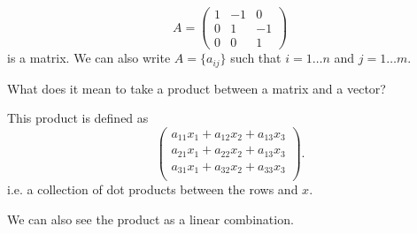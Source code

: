 
\begin{eg}
	\[
		A = \begin{pmatrix}
			1 & -1 & 0 \\ 0 & 1 & -1 \\ 0 & 0 & 1
		\end{pmatrix}
	\] is a matrix. We can also write \( A = \{a_{ij}\}   \) such that \( i = 1\ldots n \) and \( j = 1\ldots m \).
\end{eg}

What does it mean to take a product between a matrix and a vector?

\begin{definition}
	This product is defined as \[
		\begin{pmatrix}
			a_{11}x_{1} + a_{12}x_{2} + a_{13}x_{3} \\
			a_{21}x_{1} + a_{22}x_{2} + a_{13}x_{3} \\
			a_{31}x_{1} + a_{32}x_{2} + a_{33}x_{3} \\
		\end{pmatrix}
	.\] i.e. a collection of dot products between the rows and \( x \).
\end{definition}

We can also see the product as a linear combination.
